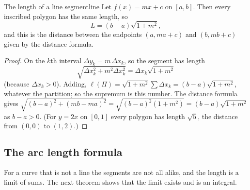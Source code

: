 \documentclass[11pt]{article}
\begin{document}
\begin{thm}{The length of a line segment}{line}
Let $f(x)=mx+c$ on $[a,b]$. Then every inscribed polygon has the same length, so
\[
L=(b-a)\sqrt{1+m^2},
\]
and this is the distance between the endpoints $(a,ma+c)$ and $(b,mb+c)$ given by the distance formula.
\end{thm}
\begin{proof}
On the $k$th interval $\Delta y_k=m\,\Delta x_k$, so the segment has length
\[
\sqrt{\Delta x_k^2+m^2\Delta x_k^2}=\Delta x_k\sqrt{1+m^2}
\]
(because $\Delta x_k>0$). Adding, $\ell(\Pi)=\sqrt{1+m^2}\sum\Delta x_k=(b-a)\sqrt{1+m^2}$, whatever the partition; so the supremum is this number. The distance formula gives $\sqrt{(b-a)^2+(mb-ma)^2}=\sqrt{(b-a)^2(1+m^2)}=(b-a)\sqrt{1+m^2}$ as $b-a>0$. (For $y=2x$ on $[0,1]$ every polygon has length $\sqrt5$, the distance from $(0,0)$ to $(1,2)$.)
\end{proof}

\subsection*{The arc length formula}

For a curve that is not a line the segments are not all alike, and the length is a limit of sums. The next theorem shows that the limit exists and is an integral.
\end{document}
